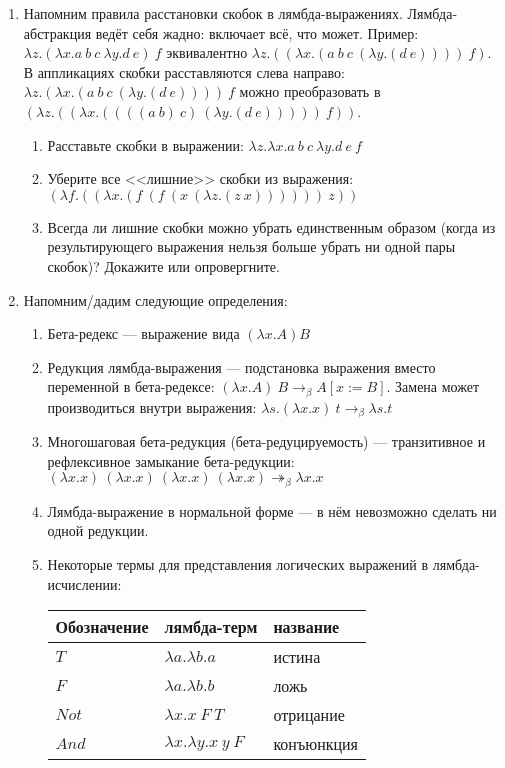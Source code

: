 \documentclass[10pt,a4paper,oneside]{article}
\begin{document}
\begin{enumerate}
\item Напомним правила расстановки скобок в лямбда-выражениях. Лямбда-абстракция ведёт себя жадно: 
включает всё, что может. Пример: $\lambda z.(\lambda x.a\ b\ c\ \lambda y.d\ e)\ f$ 
эквивалентно $\lambda z.((\lambda x.(a\ b\ c\ (\lambda y.(d\ e))))\ f)$.
В аппликациях скобки расставляются слева направо:
$\lambda z.(\lambda x.(a\ b\ c\ (\lambda y.(d\ e))))\ f$ можно преобразовать в  
$(\lambda z.((\lambda x.((((a\ b)\ c)\ (\lambda y.(d\ e)))))\ f))$.

\begin{enumerate}
\item Расставьте скобки в выражении:
$\lambda z.\lambda x.a\ b\ c\ \lambda y.d\ e\ f$
\item Уберите все <<лишние>> скобки из выражения:
$(\lambda f.((\lambda x.(f\ (f\ (x\ (\lambda z.(z\ x))))))\ z))$
\item Всегда ли лишние скобки можно убрать единственным образом (когда из результирующего
выражения нельзя больше убрать ни одной пары скобок)? Докажите или опровергните.
\end{enumerate}

\item Напомним/дадим следующие определения:

\begin{enumerate}
\item Бета-редекс --- выражение вида $(\lambda x.A) B$

\item Редукция лямбда-выражения --- подстановка выражения вместо переменной в бета-редексе:
$(\lambda x.A)\ B \rightarrow_\beta A[x:=B]$. Замена может производиться внутри выражения:
$\lambda s.(\lambda x.x)\ t \rightarrow_\beta \lambda s.t$

\item Многошаговая бета-редукция (бета-редуцируемость) --- транзитивное и рефлексивное
замыкание бета-редукции: $(\lambda x.x)\ (\lambda x.x)\ (\lambda x.x)\ (\lambda x.x) \twoheadrightarrow_\beta \lambda x.x$

\item Лямбда-выражение в нормальной форме --- в нём невозможно сделать ни одной редукции.

\item Некоторые термы для представления логических выражений в лямбда-исчислении:

\begin{tabular}{lll}
Обозначение & лямбда-терм & название\\\hline
$T$ & $\lambda a.\lambda b.a$ & истина\\
$F$ & $\lambda a.\lambda b.b$ & ложь\\
$Not$ & $\lambda x.x\ F\ T$ & отрицание\\
$And$ & $\lambda x.\lambda y.x\ y\ F$ & конъюнкция
\end{tabular}


\end{enumerate}
\end{enumerate}
\end{document}
